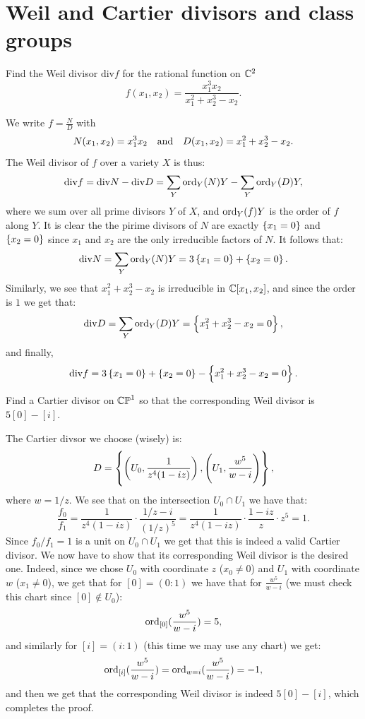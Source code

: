 \documentclass[11pt, a4paper]{article}
\renewcommand{\div}{\mathrm{div}} %
\begin{document}
\newpage

\section{Weil and Cartier divisors and class groups}

\begin{exercise}
  Find the Weil divisor $\div f$ for the rational function on $\mathbb{C}^2$
  \[
    f(x_1,x_2) =
    \frac{x_1^3 x_2}{x_1^2 + x_2^3 - x_2}.
  \]
\end{exercise}
\begin{solution}
  We write $f = \frac{N}{D}$ with
  \[
    N(x_1,x_2) = x_1^3 x_2 \quad \text{and} \quad
    D(x_1,x_2) = x_1^2 + x_2^3 - x_2.
  \]
  The Weil divisor of $f$ over a variety $X$ is thus:
  \[
    \div f =
    \div N - \div D =
    \sum_{Y} \ord_Y(N) Y - \sum_{Y} \ord_Y(D) Y,
  \]
  where we sum over all prime divisors $Y$ of $X$,
  and $\operatorname{ord}_Y(f) Y$  is the order of $f$ along $Y$.
  It is clear the the pirime divisors of $N$ are exactly
  $\left\{x_1 = 0\right\}$ and $\left\{x_2 = 0\right\}$ since $x_1$ and $x_2$
  are the only irreducible factors of $N$.
  It follows that:
  \[
    \div N =
    \sum_{Y} \ord_Y(N) Y =
    3 \set{x_1 = 0} + \set{x_2 = 0}.
  \]
  Similarly, we see that $x_1^2 + x_2^3 - x_2$ is irreducible in $\mathbb{C}[x_1,x_2]$,
  and since the order is $1$ we get that:
  \[
    \div D =
    \sum_{Y} \ord_Y(D) Y =
    \set{x_1^2 + x_2^3 - x_2 = 0},
  \]
  and finally,
  \[
    \div f =
    3 \set{x_1 = 0} + \set{x_2 = 0} -
    \set{x_1^2 + x_2^3 - x_2 = 0}.
  \]
\end{solution}

\begin{exercise}
  Find a Cartier divisor on $\mathbb{CP}^1$ so that the corresponding
  Weil divisor is $5[0] - [i]$.
\end{exercise}
\begin{solution}
    The Cartier divsor we choose (wisely) is:
  \[
    D = \set{\del{U_0, \frac{1}{z^4 (1 - i z)}}, \del{U_1, \frac{w^5}{w - i}}},
  \]
  where $w = 1/z$.
  We see that on the intersection $U_0 \cap U_1$ we have that:
  \[
    \frac{f_0}{f_1} =
    \frac{1}{z^4 (1 - i z)} \cdot \frac{1/z - i}{(1/z)^5} =
    \frac{1}{z^4 (1 - i z)} \cdot \frac{1 - i z}{z} \cdot z^5 = 1.
  \]
  Since $f_0/f_1 = 1$ is a unit on $U_0 \cap U_1$ we get that this is indeed
  a valid Cartier divisor.
  We now have to show that its corresponding Weil divisor is the desired one.
  Indeed, since we chose $U_0$ with coordinate $z$ ($x_0 \neq 0$)
  and $U_1$ with coordinate $w$ ($x_1 \neq 0$),
  we get that for $[0] = (0 : 1)$ we have that for $\frac{w^5}{w - i}$
  (we must check this chart since $[0] \notin U_0$):
  \[
    \operatorname{ord}_{[0]}(\frac{w^5}{w - i}) = 5,
  \]
  and similarly for $[i] = (i : 1)$ (this time we may use any chart)
  we get:
  \[
    \operatorname{ord}_{[i]}(\frac{w^5}{w - i}) =
    \operatorname{ord}_{w = i}(\frac{w^5}{w - i}) = -1,
  \]
  and then we get that the corresponding Weil divisor is indeed
  $5[0] - [i]$, which completes the proof.
\end{solution}
\end{document}
